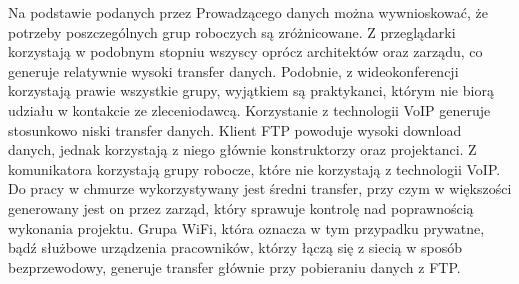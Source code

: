 \documentclass[a4paper, 12pt]{article}
\begin{document}
Na podstawie podanych przez Prowadzącego danych można wywnioskować, że potrzeby poszczególnych grup roboczych są zróżnicowane. Z przeglądarki korzystają w podobnym stopniu wszyscy oprócz architektów oraz zarządu, co generuje relatywnie wysoki transfer danych. Podobnie, z wideokonferencji korzystają prawie wszystkie grupy, wyjątkiem są praktykanci, którym nie biorą udziału w kontakcie ze zleceniodawcą. Korzystanie z technologii VoIP generuje stosunkowo niski transfer danych. Klient FTP powoduje wysoki download danych, jednak korzystają z niego głównie konstruktorzy oraz projektanci. Z komunikatora korzystają grupy robocze, które nie korzystają z technologii VoIP. Do pracy w chmurze wykorzystywany jest średni transfer, przy czym w większości generowany jest on przez zarząd, który sprawuje kontrolę nad poprawnością wykonania projektu. Grupa WiFi, która oznacza w tym przypadku prywatne, bądź służbowe urządzenia pracowników, którzy łączą się z siecią w sposób bezprzewodowy, generuje transfer głównie przy pobieraniu danych z FTP.
\end{document}
